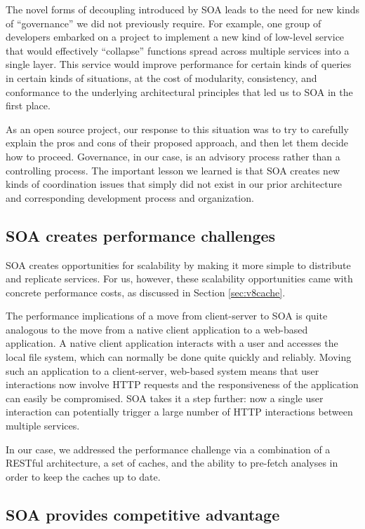 \documentclass[conference,compsoc]{IEEEtran}
\begin{document}
The novel forms of decoupling introduced by SOA leads to the need for new
kinds of ``governance'' we did not previously require.  For example, one
group of developers embarked on a project to implement a new kind of
low-level service that would effectively ``collapse'' functions spread
across multiple services into a single layer.  This service would improve
performance for certain kinds of queries in certain kinds of situations, at
the cost of modularity, consistency, and conformance to the underlying
architectural principles that led us to SOA in the first place.

As an open source project, our response to this situation was to try to
carefully explain the pros and cons of their proposed approach, and then
let them decide how to proceed.  Governance, in our case, is an advisory
process rather than a controlling process.  The important lesson we learned
is that SOA creates new kinds of coordination issues that simply did not
exist in our prior architecture and corresponding development process and
organization.

\subsection{SOA creates performance challenges}

SOA creates opportunities for scalability by making it more simple to
distribute and replicate services. For us, however, these scalability
opportunities came with concrete performance costs, as discussed in Section
\ref{sec:v8cache}.

The performance implications of a move from client-server to SOA is quite
analogous to the move from a native client application to a web-based
application.  A native client application interacts with a user and
accesses the local file system, which can normally be done quite quickly
and reliably.  Moving such an application to a client-server, web-based
system means that user interactions now involve HTTP requests and the
responsiveness of the application can easily be compromised.  SOA takes it
a step further: now a single user interaction can potentially trigger a
large number of HTTP interactions between multiple services.

In our case, we addressed the performance challenge via a combination of a
RESTful architecture, a set of caches, and the ability to pre-fetch
analyses in order to keep the caches up to date.

\subsection{SOA provides competitive advantage}
\end{document}
